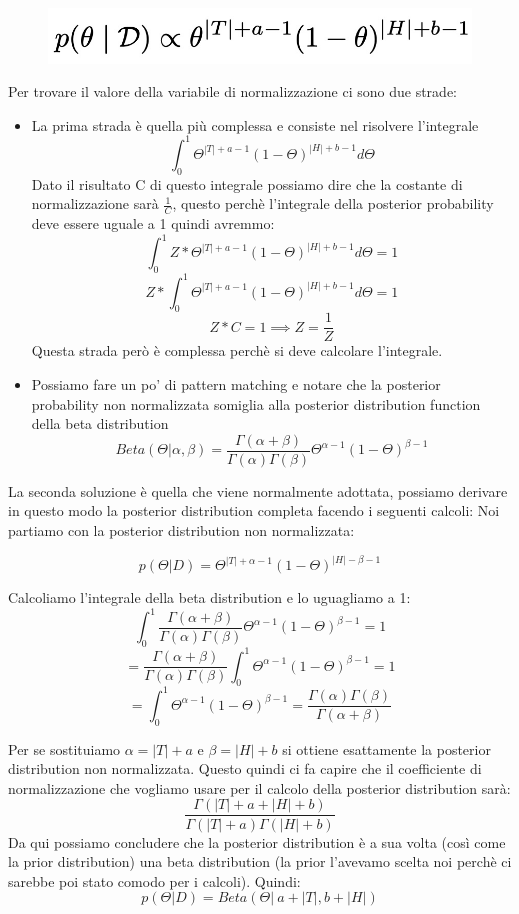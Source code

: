 \documentclass[14pt]{extreport}
\begin{document}
\begin{figure}[H]
	\centering
	\includegraphics[width=0.7\linewidth]{45.jpeg}
\end{figure}

Per trovare il valore della variabile di normalizzazione ci sono due strade:
\begin{itemize}
	\item La prima strada è quella più complessa e consiste nel risolvere l'integrale $$\int_0^1 \Theta^{|T|+a-1} (1-\Theta)^{|H|+b-1} d\Theta$$ Dato
	      il risultato C di questo integrale possiamo dire che la costante di normalizzazione sarà $\frac{1}{C}$, questo perchè l'integrale della
	      posterior probability deve essere uguale a 1 quindi avremmo: $$\int_0^1 Z * \Theta^{|T|+a-1} (1-\Theta)^{|H|+b-1} d\Theta = 1$$ $$Z*\int_0^1
	      \Theta^{|T|+a-1} (1-\Theta)^{|H|+b-1} d\Theta = 1$$ $$Z*C = 1 \implies Z = \frac{1}{Z} $$	Questa strada però è complessa perchè si deve
	      calcolare l'integrale.
	\item Possiamo fare un po' di pattern matching e notare che la posterior probability non normalizzata somiglia alla posterior distribution
	function della beta distribution
	      $$Beta(\Theta | \alpha, \beta) = \frac{\Gamma(\alpha + \beta)}{\Gamma(\alpha)\Gamma(\beta)}\Theta^{\alpha-1}(1-\Theta)^{\beta-1}$$
\end{itemize}

La seconda soluzione è quella che viene normalmente adottata, possiamo derivare in questo modo la posterior distribution completa facendo i seguenti
calcoli: Noi partiamo con la posterior distribution non normalizzata:

$$p(\Theta | D) = \Theta^{|T| +\alpha-1}(1-\Theta)^{|H|-\beta-1}$$

Calcoliamo l'integrale della beta distribution e lo uguagliamo a 1:
$$\int_0^1\frac{\Gamma(\alpha + \beta)}{\Gamma(\alpha)\Gamma(\beta)}\Theta^{\alpha-1}(1-\Theta)^{\beta-1} = 1$$
$$= \frac{\Gamma(\alpha + \beta)}{\Gamma(\alpha)\Gamma(\beta)}\int_0^1\Theta^{\alpha-1}(1-\Theta)^{\beta-1} = 1$$
$$= \int_0^1\Theta^{\alpha-1}(1-\Theta)^{\beta-1} = \frac{\Gamma(\alpha)\Gamma(\beta)}{\Gamma(\alpha + \beta)}$$

Per se sostituiamo $\alpha = |T|+a$ e $\beta = |H|+b$ si ottiene esattamente la posterior distribution non normalizzata. Questo quindi ci fa capire
che il coefficiente di normalizzazione che vogliamo usare per il calcolo della posterior distribution sarà:
$$\frac{\Gamma(|T|+a + |H|+b)}{\Gamma(|T|+a)\Gamma(|H|+b)}$$ Da qui possiamo concludere che la posterior distribution è a sua volta (così come la
prior distribution) una beta distribution (la prior l'avevamo scelta noi perchè ci sarebbe poi stato comodo per i calcoli). Quindi: $$p(\Theta|D) =
Beta(\Theta|\ a+|T|, b+|H|)$$
\end{document}
